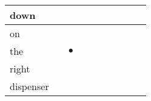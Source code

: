 \documentclass[landscape]{article}
\newcommand{\ssp}{\hspace{2pt}}
\newcommand{\mex}{\cellcolor{g}$\bullet$}
\begin{document}
\begin{tabular}{|l|p{10pt}|p{10pt}|p{10pt}|p{10pt}|p{10pt}|p{10pt}|p{10pt}|p{10pt}|p{10pt}|}
\hline
\ssp down \ssp&\hspace{2pt}&\hspace{2pt}&\hspace{2pt}&\hspace{2pt}&\hspace{2pt}&\hspace{2pt}&\hspace{2pt}&\hspace{2pt}&\hspace{2pt}\\
\hline
\ssp on \ssp&\hspace{2pt}&\hspace{2pt}&\hspace{2pt}&\hspace{2pt}&\hspace{2pt}&\hspace{2pt}&\hspace{2pt}&\hspace{2pt}&\hspace{2pt}\\
\hline
\ssp \cellcolor{ref1}the \ssp&\hspace{2pt}&\hspace{2pt}\mex&\hspace{2pt}&\hspace{2pt}&\hspace{2pt}&\hspace{2pt}&\hspace{2pt}&\hspace{2pt}&\hspace{2pt}\\
\hline
\ssp right \ssp&\hspace{2pt}&\hspace{2pt}&\hspace{2pt}&\hspace{2pt}&\hspace{2pt}&\hspace{2pt}&\hspace{2pt}&\hspace{2pt}&\hspace{2pt}\\
\hline
\ssp dispenser \ssp&\hspace{2pt}&\hspace{2pt}&\hspace{2pt}&\hspace{2pt}&\hspace{2pt}&\hspace{2pt}&\hspace{2pt}&\hspace{2pt}&\hspace{2pt}\\

\end{tabular}
\end{document}
